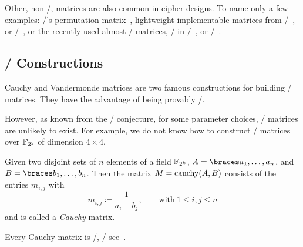 Other, non-\MDS/, matrices are also common in cipher designs.
To name only a few examples: \present/'s permutation matrix~, lightweight implementable matrices from \prince/~, or \pride/~, or the recently used almost-\MDS/ matrices, \eg/ in \midori/~, or \qarma/~.

\subsection{\MDS/ Constructions}
Cauchy and Vandermonde matrices are two famous constructions for building \MDS/ matrices.
They have the advantage of being provably \MDS/.

However, as known from the \MDS/ conjecture, for some parameter choices, \MDS/ matrices are unlikely to exist.
For example, we do not know how to construct \MDS/ matrices over $\mathbb{F}_{2^2}$ of dimension $4 \times 4$.

\begin{definition}
    Given two disjoint sets of $n$ elements of a field $\mathbb{F}_{2^k}$, $A = \set{a_1, \ldots, a_n}$, and $B = \set{b_1, \ldots, b_n}$.
    Then the matrix $M = \operatorname{cauchy}(A, B)$ consists of the entries $m_{i,j}$ with
    \begin{equation*}
        m_{i,j} \coloneqq \frac{1}{a_i - b_j}, \qquad \text{with}\ 1 \leq i,j \leq n
    \end{equation*}
    and is called a \emph{Cauchy} matrix.
\end{definition}

Every Cauchy matrix is \MDS/, \eg/ see~\cite[Lemma 1]{AFRICACRYPT:GupRay13}.

